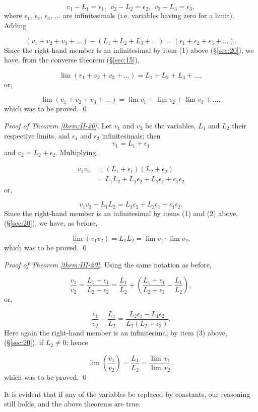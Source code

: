 \[
v_1 - L_1 	= \epsilon_1,\ \ 
v_2 - L_2 	= \epsilon_2,\ \ 
v_3 - L_3 	= \epsilon_3,
\]
where $\epsilon_1$, $\epsilon_2$, $\epsilon_3$, $\dots$ are 
infinitesimals (i.e. variables having zero for a limit). Adding

\[
(v_1 + v _2 + v_3 + \dots) - (L_1 + L_2 + L_3 + . . .) 
= (\epsilon_1 + \epsilon_2 + \epsilon_3 + \dots).
\]
Since the right-hand member is an infinitesimal by item
(1) above (\S \ref{sec:20}), 
we have, from the converse theorem (\S \ref{sec:15}),

\[
  	\lim (v_1 + v_2 + v_3 + \dots) 
= L_1 + L_2 + L_3 + \dots,
\]
or, 	

\[
\lim (v_1 + v_2 + v_3 + \dots) 
= \lim v_1 + \lim v_2 + \lim v_3 + \dots,
\]
which was to be proved. \qed


{\it Proof of Theorem \ref{thrm:II-20}.} 
Let $v_1$ and $v_2$ be the variables, $L_1$ and $L_2$ their 
respective limits, and $\epsilon_1$ and $\epsilon_2$ infinitesimals; 
then
\[
  	v_1 	= L_1 + \epsilon_1
\]
and $v_2 = L_2 + \epsilon_2$.
Multiplying, 

\[
\begin{array}
{ll}
v_1v_2 	&= (L_1 + \epsilon_1)(L_2 + \epsilon_2)\\
&	= L_1L_2 + L_1\epsilon_2 + L_2\epsilon_1 + \epsilon_1\epsilon_2
\end{array}
\]
or, 	  	 

\[
v_1v_2 - L_1L_2 = L_1\epsilon_2 + L_2\epsilon_1 + \epsilon_1\epsilon_2.
\]
Since the right-hand member is an infinitesimal 
by items (1) and (2) above, (\S \ref{sec:20}), we have, as before,

\[
\lim (v_1v_2) = L_1L_2 = \lim v_1 \cdot \lim v_2,
\]
which was to be proved. \qed

{\it Proof of Theorem \ref{thrm:III-20}.}  
Using the same notation as before,

\[
  \frac{v_1}{v_2} = \frac{L_1 + \epsilon_1}{L_2 + \epsilon_2} 
= \frac{L_1}{L_2} + \left ( \frac{L_1 + \epsilon_1}{L_2 + \epsilon_2} 
- \frac{L_1}{L_2} \right ),
\]
or,

\[
\frac{v_1}{v_2} - \frac{L_1}{L_2} 
= \frac{L_2 \epsilon_1 - L_1 \epsilon_2}{L_2 (L_2 + \epsilon_2)}.
\]
Here again the right-hand member is an infinitesimal 
by item (3) above, (\S \ref{sec:20}), if $L_2 \ne 0$; hence

\[
\lim \left ( \frac{v_1}{v_2} \right ) = \frac{L_1}{L_2} 
= \frac{\lim\,v_1}{\lim\,v_2},
\]
which was to be proved. \qed

It is evident that if any of the variables be 
replaced by constants, our reasoning still holds, and 
the above theorems are true.

